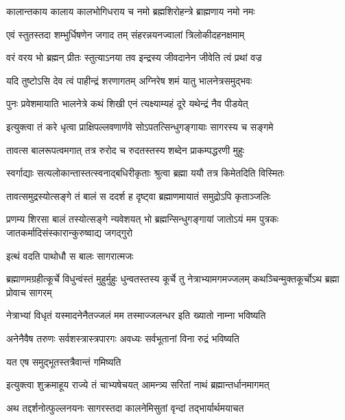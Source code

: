 \twolineshloka
{कालान्तकाय कालाय कालभोगिधराय च}
{नमो ब्रह्मशिरोहन्त्रे ब्राह्मणाय नमो नमः} %


\twolineshloka
{एवं स्तुतस्तदा शम्भुर्धिषणेन जगाद तम्}
{संहरन्नयनज्वालां त्रिलोकीदहनक्षमाम्} %

\twolineshloka
{वरं वरय भो ब्रह्मन् प्रीतः स्तुत्याऽनया तव}
{इन्द्रस्य जीवदानेन जीवेति त्वं प्रथां वज्र} %


\twolineshloka
{यदि तुष्टोऽसि देव त्वं पाहीन्द्रं शरणागतम्}
{अग्निरेष शमं यातु भालनेत्रसमुद्भवः} %


\twolineshloka
{पुनः प्रवेशमायाति भालनेत्रे कथं शिखी}
{एनं त्यक्ष्याम्यहं दूरे यथेन्द्रं नैव पीडयेत्} %


\twolineshloka
{इत्युक्त्वा तं करे धृत्वा प्राक्षिपल्लवणार्णवे}
{सोऽपतत्सिन्धुगङ्गायाः सागरस्य च सङ्गमे} %

\twolineshloka
{तावत्स बालरूपत्वमगात् तत्र रुरोद च}
{रुदतस्तस्य शब्देन प्राकम्पद्धरणी मुहुः} %

\twolineshloka
{स्वर्गाद्याः सत्यलोकान्तास्तत्स्वनाद्बधिरीकृताः}
{श्रुत्वा ब्रह्मा ययौ तत्र किमेतदिति विस्मितः} %

\twolineshloka
{तावत्समुद्रस्योत्सङ्गे तं बालं स ददर्श ह}
{दृष्ट्वा ब्रह्माणमायातं समुद्रोऽपि कृताञ्जलिः} %

\threelineshloka
{प्रणम्य शिरसा बालं तस्योत्सङ्गे न्यवेशयत्}
{भो ब्रह्मन्सिन्धुगङ्गायां जातोऽयं मम पुत्रकः}
{जातकर्मादिसंस्कारान्कुरुष्वाद्य जगद्गुरो} %



\onelineshloka
{इत्थं वदति पाथोधौ स बालः सागरात्मजः} %

\threelineshloka
{ब्रह्माणमग्रहीत्कूर्चे विधुन्वंस्तं मुहुर्मुहुः}
{धुन्वतस्तस्य कूर्चे तु नेत्राभ्यामगमज्जलम्}
{कथञ्चिन्मुक्तकूर्चोऽथ ब्रह्मा प्रोवाच सागरम्} %


\twolineshloka
{नेत्राभ्यां विधृतं यस्मादनेनैतज्जलं मम}
{तस्माज्जलन्धर इति ख्यातो नाम्ना भविष्यति} %

\twolineshloka
{अनेनैवैष तरुणः सर्वशस्त्रास्त्रपारगः}
{अवध्यः सर्वभूतानां विना रुद्रं भविष्यति} %


\onelineshloka
{यत एष समुद्भूतस्तत्रैवान्तं गमिष्यति} %


\twolineshloka
{इत्युक्त्वा शुक्रमाहूय राज्ये तं चाभ्यषेचयत्}
{आमन्त्र्य सरितां नाथं ब्रह्मान्तर्धानमागमत्} %

\twolineshloka
{अथ तद्दर्शनोत्फुल्लनयनः सागरस्तदा}
{कालनेमिसुतां वृन्दां तद्भार्यार्थमयाचत} %

